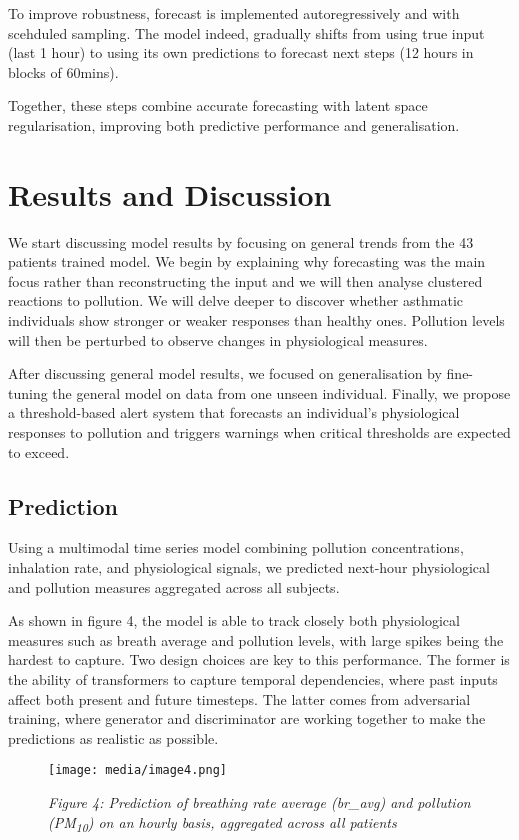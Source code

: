\documentclass[12pt,a4paper]{report}
\begin{document}
To improve robustness, forecast is implemented autoregressively and with scehduled sampling. 
The model indeed, gradually shifts from using true input (last 1 hour) to using its own predictions to forecast next steps (12 hours in blocks of 60mins). 

Together, these steps combine accurate forecasting with latent space
regularisation, improving both predictive performance and
generalisation.

\chapter{Results and Discussion}
We start discussing model results by focusing on general trends from the
43 patients trained model. We begin by explaining why forecasting was
the main focus rather than reconstructing the input and we will then
analyse clustered reactions to pollution. We will delve deeper to
discover whether asthmatic individuals show stronger or weaker responses
than healthy ones. Pollution levels will then be perturbed to observe
changes in physiological measures.

After discussing general model results, we focused on generalisation by
fine-tuning the general model on data from one unseen individual.
Finally, we propose a threshold-based alert system that forecasts an
individual's physiological responses to pollution and triggers warnings
when critical thresholds are expected to exceed.

\section{Prediction}
Using a multimodal time series model combining pollution concentrations,
inhalation rate, and physiological signals, we predicted next-hour
physiological and pollution measures aggregated across all subjects.

As shown in figure 4, the model is able to track closely both
physiological measures such as breath average and pollution levels, with
large spikes being the hardest to capture. Two design choices are key to
this performance. The former is the ability of transformers to capture
temporal dependencies, where past inputs affect both present and future
timesteps. The latter comes from adversarial training, where generator
and discriminator are working together to make the predictions as
realistic as possible.

\clearpage  %

\begin{figure}[t]
    \centering
    \texttt{[image: media/image4.png]}
    \caption*{\emph{Figure 4: Prediction of breathing rate average (br\_avg) and 
    pollution (PM\textsubscript{10}) on an hourly basis, aggregated across all patients}}
\end{figure}
\end{document}
